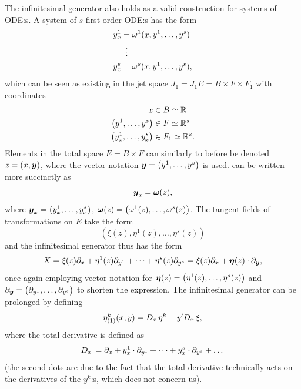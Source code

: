 The infinitesimal generator also holds as a valid construction for systems of ODE:s.
A system of \(s\) first order ODE:s has the form
\begin{align}
  \begin{split} \label{eq:first-order-system-ode}
    y^1_x &= \omega^1(x, y^1, \dots, y^s) \\
    &\equalsvdots \\
    y^s_x &= \omega^s(x, y^1, \dots, y^s),
  \end{split}
\end{align}
which can be seen as existing in the jet space \(J_1 = J_1 E = B \times F \times F_1\) with coordinates
\begin{align*}
  x &\in B \simeq \reals \\
  \left(y^1, \dots, y^s\right) &\in F \simeq \reals^s \\
  \left(y^1_x, \dots, y^s_x\right) &\in F_1 \simeq \reals^s.
\end{align*}
Elements in the total space \(E = B \times F\) can similarly to before be denoted \(z = \left(x, \vect{y}\right)\), where the vector notation \(\vect{y} = \left(y^1, \dots, y^s\right)\) is used.
 can be written more succinctly as
\begin{equation} \label{eq:first-order-system-ode-short}
  \boldsymbol{y}_x = \boldsymbol{\omega}(z),
\end{equation}
where \(\vect{y}_x = \left(y^1_x, \dots, y^s_x\right)\), \(\vect{\omega}(z) = \left(\omega^1(z), \dots, \omega^s(z)\right)\).
The tangent fields of transformations on \(E\) take the form
\begin{equation*} %
  \left(\xi(z), \eta^1(z), \dots, \eta^s(z)\right)
\end{equation*}
and the infinitesimal generator thus has the form
\begin{equation*}
  X = \xi(z) \partial_x + \eta^1(z) \partial_{y^1} + \dots + \eta^s(z) \partial_{y^s} = \xi(z) \partial_x + \boldsymbol{\eta}(z) \cdot \partial_{\boldsymbol{y}},
\end{equation*}
once again employing vector notation for \(\vect{\eta}(z) = \left(\eta^1(z), \dots, \eta^s(z)\right)\) and \(\partial_{\vect{y}} = \left(\partial_{y^1}, \dots, \partial_{y^s}\right)\) to shorten the expression.
The infinitesimal generator can be prolonged by defining
\begin{equation*}
  {\eta^k_{(1)}}(x,y) =
  D_{x}\, \eta^k - y' D_{x}\, \xi,
\end{equation*}
where the total derivative is defined as
\begin{equation*}
  D_{x}\, = \partial_x + y^1_x \cdot \partial_{y^1} + \dots + y^s_x \cdot \partial_{y^s} + \dots
\end{equation*}
(the second dots are due to the fact that the total derivative technically acts on the derivatives of the \(y^k\):s, which does not concern us).

